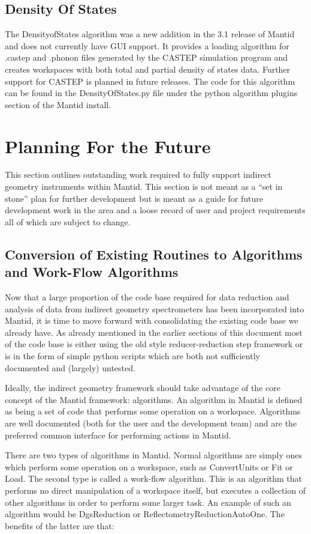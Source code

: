 \documentclass[paper=a4, fontsize=11pt]{scrartcl}	%
\numberwithin{equation}{section}															%
\numberwithin{figure}{section}																%
\numberwithin{table}{section}																%
\begin{document}
\subsection{Density Of States}
The DensityofStates algorithm was a new addition in the 3.1 release of Mantid and does not currently have GUI support. It provides a loading algorithm for .castep and .phonon files generated by the CASTEP simulation program and creates workspaces with both total and partial density of states data. Further support for CASTEP is planned in future releases. The code for this algorithm can be found in the DensityOfStates.py file under the python algorithm plugins section of the Mantid install.

\clearpage
\section{Planning For the Future}
This section outlines outstanding work required to fully support indirect geometry instruments within Mantid. This section is not meant as a ``set in stone'' plan for further development but is meant as a guide for future development work in the area and a loose record of user and project requirements all of which are subject to change.

\subsection{Conversion of Existing Routines to Algorithms and Work-Flow Algorithms}
Now that a large proportion of the code base required for data reduction and analysis of data from indirect geometry spectrometers has been incorporated into Mantid, it is time to move forward with consolidating the existing code base we already have. As already mentioned in the earlier sections of this document most of the code base is either using the old style reducer-reduction step framework or is in the form of simple python scripts which are both not sufficiently documented and (largely) untested.

Ideally, the indirect geometry framework should take advantage of the core concept of the Mantid framework: algorithms. An algorithm in Mantid is defined as being a set of code that performs some operation on a workspace. Algorithms are well documented (both for the user and the development team) and are the preferred common interface for performing actions in Mantid.

There are two types of algorithms in Mantid. Normal algorithms are simply ones which perform some operation on a workspace, such as ConvertUnits or Fit or Load. The second type is called a work-flow algorithm. This is an algorithm that performs no direct manipulation of a workspace itself, but executes a collection of other algorithms in order to perform some larger task. An example of such an algorithm would be DgsReduction or ReflectometryReductionAutoOne. The benefits of the latter are that: 
\end{document}
